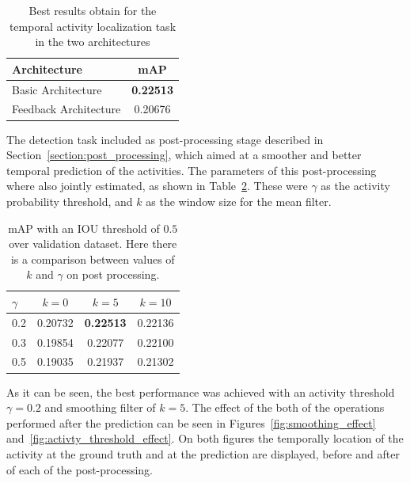 \begin{table}[H]
\begin{center}
\begin{tabular}{|l|c|}
\hline
Architecture & mAP \\
\hline\hline
Basic Architecture & \bf0.22513 \\
Feedback Architecture & 0.20676 \\
\hline
\end{tabular}
\end{center}
\caption{Best results obtain for the temporal activity localization task in the two architectures}
\label{table:detection_architecture_comparison}
\end{table}

The detection task included as post-processing stage described in Section~\ref{section:post_processing}, which aimed at a smoother and better temporal prediction of the activities.
The parameters of this post-processing where also jointly estimated, as shown in Table~\ref{table:detection_postprocessing_comparison}.
These were $\gamma$ as the activity probability threshold, and $k$ as the window size for the mean filter.

\begin{table}[H]
\begin{center}
\begin{tabular}{|l|c|c|c|}
\hline
$\gamma$ & $k=0$ & $k=5$ & $k=10$ \\
\hline
0.2 & 0.20732 & \bf0.22513 & 0.22136 \\
0.3 & 0.19854 & 0.22077 & 0.22100 \\
0.5 & 0.19035 & 0.21937 & 0.21302 \\
\hline
\end{tabular}
\end{center}
\caption{mAP with an IOU threshold of $0.5$ over validation dataset. Here there is a comparison
between values of $k$ and $\gamma$ on post processing.}
\label{table:detection_postprocessing_comparison}
\end{table}

As it can be seen, the best performance was achieved with an activity threshold $\gamma=0.2$ and smoothing filter of $k=5$. The effect of the both of the operations performed after the prediction can be seen in Figures~\ref{fig:smoothing_effect} and~\ref{fig:activty_threshold_effect}. On both figures the temporally location of the activity at the ground truth and at the prediction are displayed, before and after of each of the post-processing.

